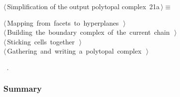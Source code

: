 \documentclass[11pt,oneside]{article}	%
\begin{document}
\begin{flushleft} \small \label{scrap23}
\protect{}$\langle\,$Simplification of the output polytopal complex\nobreak\ {\footnotesize 21a}$\,\rangle\equiv$
\vspace{-1ex}
\begin{list}{}{} \item
\mbox{}\verb@@\hbox{$\langle\,$Mapping from facets to hyperplanes\nobreak\ {\footnotesize {}}$\,\rangle$}\verb@@\\
\mbox{}\verb@@\hbox{$\langle\,$Building the boundary complex of the current chain\nobreak\ {\footnotesize {}}$\,\rangle$}\verb@@\\
\mbox{}\verb@@\hbox{$\langle\,$Sticking cells together\nobreak\ {\footnotesize {}}$\,\rangle$}\verb@@\\
\mbox{}\verb@@\hbox{$\langle\,$Gathering and writing a polytopal complex\nobreak\ {\footnotesize {}}$\,\rangle$}\verb@@\\
\mbox{}\verb@@{\NWsep}
\end{list}
\vspace{-1ex}
\footnotesize\addtolength{\baselineskip}{-1ex}
\begin{list}{}{\setlength{\itemsep}{-\parsep}\setlength{\itemindent}{-\leftmargin}}
\item \NWtxtMacroRefIn\ .
\end{list}
\end{flushleft}

\subsubsection{Summary}
\end{document}
